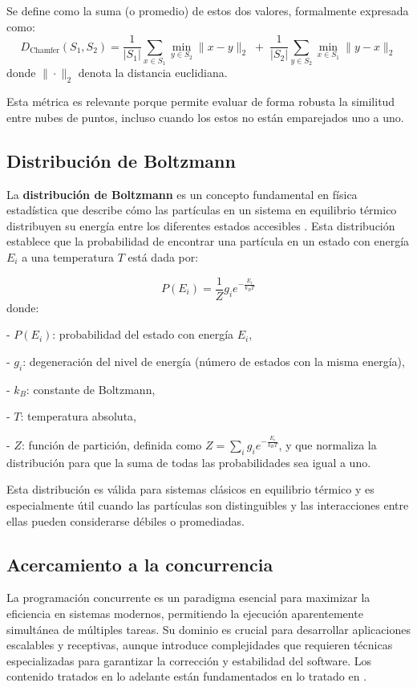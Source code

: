 Se define como la suma (o promedio) de estos dos valores, formalmente expresada como:
\[
D_{\mathrm{Chamfer}}(S_1, S_2) = \frac{1}{|S_1|} \sum_{x \in S_1} \min_{y \in S_2} \|x - y\|_2 \;+\; \frac{1}{|S_2|} \sum_{y \in S_2} \min_{x \in S_1} \|y - x\|_2
\]
donde \(\|\cdot\|_2\) denota la distancia euclidiana.

Esta métrica es relevante porque permite evaluar de forma robusta la similitud entre nubes de puntos, incluso cuando los estos no están emparejados uno a uno. 

\subsection{Distribución de Boltzmann}

La \textbf{distribución de Boltzmann} es un concepto fundamental en física estadística que describe cómo las partículas en un sistema en equilibrio térmico distribuyen su energía entre los diferentes estados accesibles \cite{Reif1965}. Esta distribución establece que la probabilidad de encontrar una partícula en un estado con energía $ E_i $ a una temperatura $ T $ está dada por:

\begin{equation}
    P(E_i) = \frac{1}{Z} g_i e^{-\frac{E_i}{k_B T}}
\end{equation}
donde:

    
- $ P(E_i) $: probabilidad del estado con energía $ E_i $,
    
- $ g_i $: degeneración del nivel de energía (número de estados con la misma energía),
    
- $ k_B $: constante de Boltzmann,
    
- $ T $: temperatura absoluta,
    
- $ Z $: función de partición, definida como $ Z = \sum_i g_i e^{-\frac{E_i}{k_B T}} $, y que normaliza la distribución para que la suma de todas las probabilidades sea igual a uno.


Esta distribución es válida para sistemas clásicos en equilibrio térmico y es especialmente útil cuando las partículas son distinguibles y las interacciones entre ellas pueden considerarse débiles o promediadas. 

\subsection{Acercamiento a la concurrencia}
La programación concurrente es un paradigma esencial para maximizar la eficiencia en sistemas modernos, permitiendo la ejecución aparentemente simultánea de múltiples tareas. Su dominio es crucial para desarrollar aplicaciones escalables y receptivas, aunque introduce complejidades que requieren técnicas especializadas para garantizar la corrección y estabilidad del software. Los contenido tratados en lo adelante están fundamentados en lo tratado en \cite{tanenbaum2008modern}.

